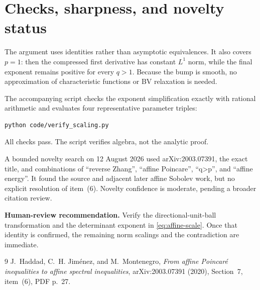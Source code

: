 \documentclass[11pt]{article}
\begin{document}
\section{Checks, sharpness, and novelty status}

The argument uses identities rather than asymptotic equivalences.  It also
covers $p=1$: then the compressed first derivative has constant $L^1$ norm,
while the final exponent remains positive for every $q>1$.  Because the bump
is smooth, no approximation of characteristic functions or BV relaxation is
needed.

The accompanying script checks the exponent simplification exactly with
rational arithmetic and evaluates four representative parameter triples:
\begin{verbatim}
python code/verify_scaling.py
\end{verbatim}
All checks pass.  The script verifies algebra, not the analytic proof.

A bounded novelty search on 12 August 2026 used arXiv:2003.07391, the exact
title, and combinations of ``reverse Zhang'', ``affine Poincare'', ``q>p'',
and ``affine energy''.  It found the source and adjacent later affine Sobolev
work, but no explicit resolution of item~(6).  Novelty confidence is moderate,
pending a broader citation review.

\medskip
\noindent\textbf{Human-review recommendation.}
Verify the directional-unit-ball transformation and the determinant exponent
in \eqref{eq:affine-scale}.  Once that identity is confirmed, the remaining
norm scalings and the contradiction are immediate.

\begin{thebibliography}{9}
J.~Haddad, C.~H. Jim\'enez, and M.~Montenegro,
\emph{From affine Poincar\'e inequalities to affine spectral inequalities},
arXiv:2003.07391 (2020), Section~7, item~(6), PDF p.~27.
\end{thebibliography}
\end{document}
